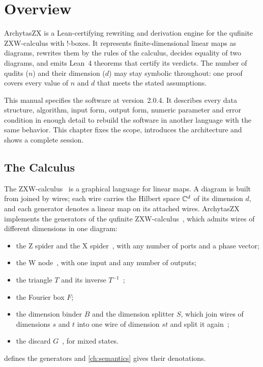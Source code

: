\chapter{Overview}\label{ch:overview}

ArchytasZX is a Lean-certifying rewriting and derivation engine for the qufinite ZXW-calculus with !-boxes. It represents finite-dimensional linear maps as diagrams, rewrites them by the rules of the calculus, decides equality of two diagrams, and emits Lean~4 theorems that certify its verdicts. The number of qudits ($n$) and their dimension ($d$) may stay symbolic throughout: one proof covers every value of $n$ and $d$ that meets the stated assumptions.

This manual specifies the software at version~2.0.4. It describes every data structure, algorithm, input form, output form, numeric parameter and error condition in enough detail to rebuild the software in another language with the same behavior. This chapter fixes the scope, introduces the architecture and shows a complete session.

\section{The Calculus}\label{sec:overview-calculus}

The ZXW-calculus~\cite{poor2023zxw} is a graphical language for linear maps. A diagram is built from  joined by wires; each wire carries the Hilbert space $\mathbb{C}^d$ of its dimension $d$, and each generator denotes a linear map on its attached wires. ArchytasZX implements the generators of the qufinite ZXW-calculus~\cite{wang2021qufinite,wang2023qufinitezxw}, which admits wires of different dimensions in one diagram:
\begin{itemize}
\item the Z spider and the X spider~\cite{coecke2011interacting,vandewetering2020working,ranchin2014depicting}, with any number of ports and a phase vector;
\item the W node~\cite{hadzihasanovic2015zw}, with one input and any number of outputs;
\item the triangle $T$ and its inverse $T^{-1}$~\cite{ng2017universal,vilmart2019triangles};
\item the Fourier box $F$;
\item the dimension binder $B$ and the dimension splitter $S$, which join wires of dimensions $s$ and $t$ into one wire of dimension $st$ and split it again~\cite{wang2023qufinitezxw};
\item the discard $G$~\cite{carette2019mixed}, for mixed states.
\end{itemize}
 defines the generators and \cref{ch:semantics} gives their denotations.

